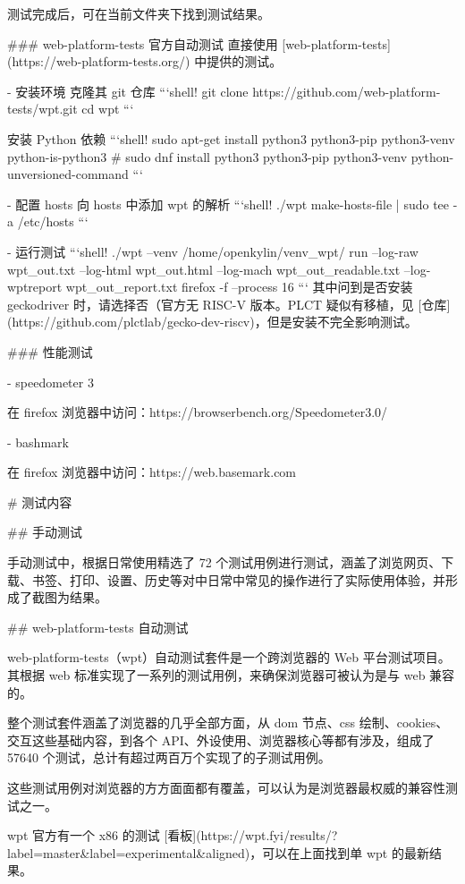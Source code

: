 \documentclass{article}
\begin{document}
\begin{markdown}
测试完成后，可在当前文件夹下找到测试结果。

### web-platform-tests 官方自动测试
直接使用 [web-platform-tests](https://web-platform-tests.org/) 中提供的测试。

- 安装环境
克隆其 git 仓库
```shell!
git clone https://github.com/web-platform-tests/wpt.git
cd wpt
```

安装 Python 依赖
```shell!
sudo apt-get install python3 python3-pip python3-venv python-is-python3
# sudo dnf install python3 python3-pip python3-venv python-unversioned-command
```

- 配置 hosts
向 hosts 中添加 wpt 的解析
```shell!
./wpt make-hosts-file | sudo tee -a /etc/hosts
```

- 运行测试
```shell!
./wpt --venv /home/openkylin/venv_wpt/ run --log-raw wpt_out.txt --log-html wpt_out.html --log-mach wpt_out_readable.txt --log-wptreport wpt_out_report.txt firefox -f --process 16
```
其中问到是否安装 geckodriver 时，请选择否（官方无 RISC-V 版本。PLCT 疑似有移植，见 [仓库](https://github.com/plctlab/gecko-dev-riscv)，但是安装不完全影响测试。

### 性能测试

- speedometer 3

在 firefox 浏览器中访问：https://browserbench.org/Speedometer3.0/

- bashmark

在 firefox 浏览器中访问：https://web.basemark.com

# 测试内容

## 手动测试

手动测试中，根据日常使用精选了 72 个测试用例进行测试，涵盖了浏览网页、下载、书签、打印、设置、历史等对中日常中常见的操作进行了实际使用体验，并形成了截图为结果。

## web-platform-tests 自动测试

web-platform-tests（wpt）自动测试套件是一个跨浏览器的 Web 平台测试项目。其根据 web 标准实现了一系列的测试用例，来确保浏览器可被认为是与 web 兼容的。

整个测试套件涵盖了浏览器的几乎全部方面，从 dom 节点、css 绘制、cookies、交互这些基础内容，到各个 API、外设使用、浏览器核心等都有涉及，组成了 57640 个测试，总计有超过两百万个实现了的子测试用例。

这些测试用例对浏览器的方方面面都有覆盖，可以认为是浏览器最权威的兼容性测试之一。

wpt 官方有一个 x86 的测试 [看板](https://wpt.fyi/results/?label=master&label=experimental&aligned)，可以在上面找到单 wpt 的最新结果。


\end{markdown}
\end{document}
